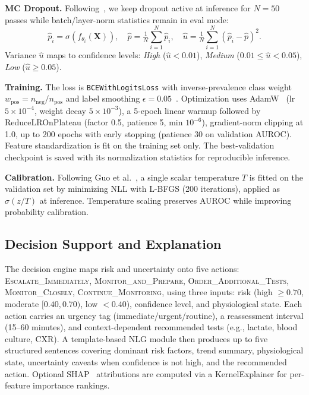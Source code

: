\documentclass[runningheads]{llncs}
\begin{document}
\textbf{MC Dropout.} Following~\cite{Gal2016}, we keep dropout active at inference for $N=50$ passes while batch/layer-norm statistics remain in eval mode:
\begin{equation}
\hat{p}_i = \sigma(f_{\theta_i}(\mathbf{X})),\quad
\hat{p} = \tfrac{1}{N}\sum_{i=1}^{N}\hat{p}_i,\quad
\hat{u} = \tfrac{1}{N}\sum_{i=1}^{N}(\hat{p}_i - \hat{p})^2.
\end{equation}
Variance $\hat{u}$ maps to confidence levels: \textit{High} ($\hat{u} < 0.01$), \textit{Medium} ($0.01 \leq \hat{u} < 0.05$), \textit{Low} ($\hat{u} \geq 0.05$).

\textbf{Training.} The loss is \texttt{BCEWithLogitsLoss} with inverse-prevalence class weight $w_\text{pos} = n_\text{neg}/n_\text{pos}$ and label smoothing $\epsilon = 0.05$~\cite{Muller2019}. Optimization uses AdamW~\cite{Loshchilov2019} (lr $5 \times 10^{-4}$, weight decay $5 \times 10^{-3}$), a 5-epoch linear warmup followed by ReduceLROnPlateau (factor 0.5, patience 5, min $10^{-6}$), gradient-norm clipping at 1.0, up to 200 epochs with early stopping (patience 30 on validation AUROC). Feature standardization is fit on the training set only. The best-validation checkpoint is saved with its normalization statistics for reproducible inference.

\textbf{Calibration.} Following Guo et al.~\cite{Guo2017}, a single scalar temperature $T$ is fitted on the validation set by minimizing NLL with L-BFGS (200 iterations), applied as $\sigma(z/T)$ at inference. Temperature scaling preserves AUROC while improving probability calibration.

\subsection{Decision Support and Explanation}
The decision engine maps risk and uncertainty onto five actions: \textsc{Escalate\_\allowbreak Immediately}, \textsc{Monitor\_\allowbreak and\_\allowbreak Prepare}, \textsc{Order\_\allowbreak Additional\_\allowbreak Tests}, \textsc{Monitor\_\allowbreak Closely}, \textsc{Continue\_\allowbreak Monitoring}, using three inputs: risk (high $\geq 0.70$, moderate $[0.40, 0.70)$, low $< 0.40$), confidence level, and physiological state. Each action carries an urgency tag (immediate/urgent/routine), a reassessment interval (15--60 minutes), and context-dependent recommended tests (e.g., lactate, blood culture, CXR). A template-based NLG module then produces up to five structured sentences covering dominant risk factors, trend summary, physiological state, uncertainty caveats when confidence is not high, and the recommended action. Optional SHAP~\cite{Lundberg2017} attributions are computed via a KernelExplainer for per-feature importance rankings.
\end{document}
